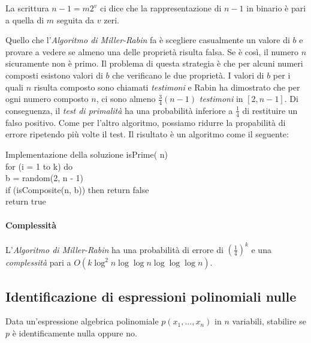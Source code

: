 \begin{note}
    La scrittura $n-1=m2^v$ ci dice che la rappresentazione di $n-1$ in
    binario è pari a quella di $m$ seguita da $v$ zeri.
\end{note}

\noindent
Quello che l'\emph{Algoritmo di Miller-Rabin} fa è scegliere casualmente un
valore di $b$ e provare a vedere se almeno una delle proprietà risulta
falsa. Se è così, il numero $n$ sicuramente non è primo. Il problema di
questa strategia è che per alcuni numeri composti esistono valori di $b$
che verificano le due proprietà. I valori di $b$ per i quali $n$ risulta
composto sono chiamati \emph{testimoni} e Rabin ha dimostrato che
per ogni numero composto $n$, ci sono almeno $\frac{3}{4}(n-1)$
\emph{testimoni} in $[2,n-1]$. Di conseguenza, il \emph{test di primalità}
ha una probabilità inferiore a $\frac{1}{4}$ di restituire un falso positivo.
Come per l'altro algoritmo, possiamo ridurre la propabilità di errore
ripetendo più volte il test. Il risultato è un algoritmo come il seguente:

\begin{minicode}{Implementazione della soluzione}
\ind{} isPrime( n)\\
    \indf for (i = 1 to k) do\\
         b = random(2, n - 1)\\
        \indff if (isComposite(n, b)) then\hfill{}
            return false\\
    \indf return true
\end{minicode}

\paragraph{Complessità}
L'\emph{Algoritmo di Miller-Rabin} ha una probabilità di errore di
$\left(\frac{1}{4}\right)^k$ e una \emph{complessità} pari a
$O(k\log^2 n\log\log n\log\log\log n)$.

\subsection{Identificazione di espressioni polinomiali nulle}
\begin{problem}
    Data un'espressione algebrica polinomiale $p(x_1,\dots,x_n)$ in $n$
    variabili, stabilire se $p$ è identificamente nulla oppure no.
\end{problem}

